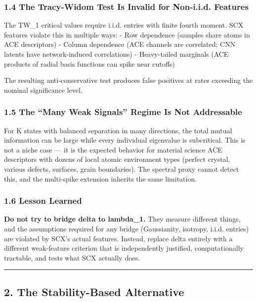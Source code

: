 \documentclass[
  12pt,
]{ctexart}
\begin{document}
\subsubsection{1.4 The Tracy-Widom Test Is Invalid for Non-i.i.d.
Features}\label{the-tracy-widom-test-is-invalid-for-non-i.i.d.-features}

The TW\_1 critical values require i.i.d. entries with finite fourth
moment. SCX features violate this in multiple ways: - Row dependence
(samples share atoms in ACE descriptors) - Column dependence (ACE
channels are correlated; CNN latents have network-induced correlations)
- Heavy-tailed marginals (ACE products of radial basis functions can
spike near cutoffs)

The resulting anti-conservative test produces false positives at rates
exceeding the nominal significance level.

\subsubsection{1.5 The ``Many Weak Signals'' Regime Is Not
Addressable}\label{the-many-weak-signals-regime-is-not-addressable}

For K states with balanced separation in many directions, the total
mutual information can be large while every individual eigenvalue is
subcritical. This is not a niche case --- it is the expected behavior
for material science ACE descriptors with dozens of local atomic
environment types (perfect crystal, various defects, surfaces, grain
boundaries). The spectral proxy cannot detect this, and the multi-spike
extension inherits the same limitation.

\subsubsection{1.6 Lesson Learned}\label{lesson-learned}

\textbf{Do not try to bridge delta to lambda\_1.} They measure different
things, and the assumptions required for any bridge (Gaussianity,
isotropy, i.i.d. entries) are violated by SCX's actual features.
Instead, replace delta entirely with a different weak-feature criterion
that is independently justified, computationally tractable, and tests
what SCX actually does.

\begin{center}\rule{0.5\linewidth}{0.5pt}\end{center}

\subsection{2. The Stability-Based
Alternative}\label{the-stability-based-alternative}
\end{document}
